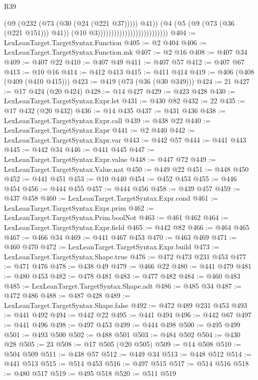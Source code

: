 \begin{lexlean}{R39}
\begin{coremodule}
                                                      (@9 (@232 (@73 (@30 (@24 (@221 @37))))) @41))
                                                    (@4
                                                      (@5 (@9 (@73 (@36 (@221 @151))) @41))
                                                      (@10 @3))))))))))))))))))))))))))
@404 := LexLeanTarget.TargetSyntax.Function
@405 := @2 @404
@406 := LexLeanTarget.TargetSyntax.Function.mk
@407 := @2 @16
@408 := @407 @34
@409 := @407 @22
@410 := @407 @49
@411 := @407 @57
@412 := @407 @67
@413 := @10 @16
@414 := @412 @413
@415 := @411 @414
@419 := @406 (@408 (@409 (@410 @415)))
@423 := @419 (@73 (@36 (@30 @349)))
@424 := 21
@427 := @17 @424 (@20 @424)
@428 := @14 @427
@429 := @423 @428
@430 := LexLeanTarget.TargetSyntax.Expr.let
@431 := @430 @82
@432 := 22
@435 := @17 @432 (@20 @432)
@436 := @14 @435
@437 := @431 @436
@438 := LexLeanTarget.TargetSyntax.Expr.call
@439 := @438 @22
@440 := LexLeanTarget.TargetSyntax.Expr
@441 := @2 @440
@442 := LexLeanTarget.TargetSyntax.Expr.var
@443 := @442 @57
@444 := @441 @443
@445 := @442 @34
@446 := @441 @445
@447 := LexLeanTarget.TargetSyntax.Expr.value
@448 := @447 @72
@449 := LexLeanTarget.TargetSyntax.Value.nat
@450 := @449 @22
@451 := @448 @450
@452 := @441 @451
@453 := @10 @440
@454 := @452 @453
@455 := @446 @454
@456 := @444 @455
@457 := @444 @456
@458 := @439 @457
@459 := @437 @458
@460 := LexLeanTarget.TargetSyntax.Expr.cond
@461 := LexLeanTarget.TargetSyntax.Expr.prim
@462 := LexLeanTarget.TargetSyntax.Prim.boolNot
@463 := @461 @462
@464 := LexLeanTarget.TargetSyntax.Expr.field
@465 := @442 @82
@466 := @464 @465
@467 := @466 @34
@469 := @441 @467 @453
@470 := @463 @469
@471 := @460 @470
@472 := LexLeanTarget.TargetSyntax.Expr.build
@473 := LexLeanTarget.TargetSyntax.Shape.true
@476 := @472 @473 @231 @453
@477 := @471 @476
@478 := @438 @49
@479 := @466 @22
@480 := @441 @479
@481 := @480 @453
@482 := @478 @481
@483 := @477 @482
@484 := @460 @483
@485 := LexLeanTarget.TargetSyntax.Shape.adt
@486 := @485 @34
@487 := @472 @486
@488 := @487 @428
@489 := LexLeanTarget.TargetSyntax.Shape.false
@492 := @472 @489 @231 @453
@493 := @441 @492
@494 := @442 @22
@495 := @441 @494
@496 := @442 @67
@497 := @441 @496
@498 := @497 @453
@499 := @444 @498
@500 := @495 @499
@501 := @493 @500
@502 := @488 @501
@503 := @484 @502
@504 := @430 @28
@505 := 23
@508 := @17 @505 (@20 @505)
@509 := @14 @508
@510 := @504 @509
@511 := @438 @57
@512 := @449 @34
@513 := @448 @512
@514 := @441 @513
@515 := @514 @453
@516 := @497 @515
@517 := @514 @516
@518 := @480 @517
@519 := @495 @518
@520 := @511 @519

\end{coremodule}
\end{lexlean}
